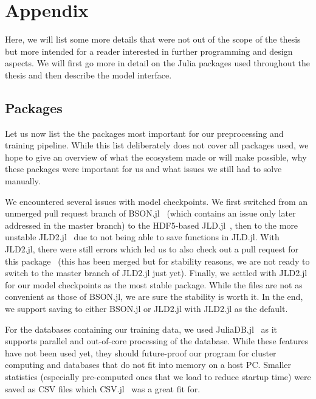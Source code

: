 \section{Appendix}

Here, we will list some more details that were not out of the scope of
the thesis but more intended for a reader interested in further
programming and design aspects. We will first go more in detail on the
Julia packages used throughout the thesis and then describe the model
interface.

\subsection{Packages}
\label{sec:packages}

Let us now list the the packages most important for our preprocessing
and training pipeline. While this list deliberately does not cover all
packages used, we hope to give an overview of what the ecosystem made
or will make possible, why these packages were important for us and
what issues we still had to solve manually.

We encountered several issues with model checkpoints. We first
switched from an unmerged pull request branch of
\mbox{BSON.jl}~\cite{JuliaIOBSONJl2019,SavingArrayLength} (which
contains an issue only later addressed in the master branch) to the
HDF5-based \mbox{JLD.jl}~\cite{JuliaIOJLDJl2019}, then to the more
unstable \mbox{JLD2.jl}~\cite{JuliaIOJLD2Jl2019} due to not being able
to save functions in \mbox{JLD.jl}. With \mbox{JLD2.jl}, there were
still errors which led us to also check out a pull request for this
package~\cite{MaybeFixTypename} (this has been merged but for
stability reasons, we are not ready to switch to the master branch of
\mbox{JLD2.jl} just yet). Finally, we settled with \mbox{JLD2.jl} for
our model checkpoints as the most stable package. While the files are
not as convenient as those of \mbox{BSON.jl}, we are sure the
stability is worth it. In the end, we support saving to either
\mbox{BSON.jl} or \mbox{JLD2.jl} with \mbox{JLD2.jl} as the default.

For the databases containing our training data, we used
\mbox{JuliaDB.jl}~\cite{JuliaComputingJuliaDBJl2019} as it supports
parallel and out-of-core processing of the database. While these
features have not been used yet, they should future-proof our program
for cluster computing and databases that do not fit into memory on a
host PC. Smaller statistics (especially pre-computed ones that we load
to reduce startup time) were saved as CSV files which
\mbox{CSV.jl}~\cite{JuliaDataCSVJl2019} was a great fit for.

